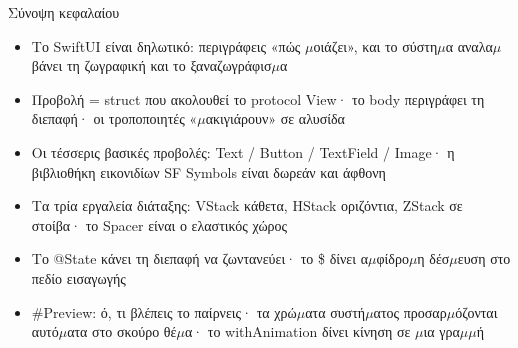 \begin{tcbsummary}{Σύνοψη κεφαλαίου}
\begin{itemize}
  \item Το SwiftUI είναι δηλωτικό: περιγράφεις «πώς $\mu$οιάζει», και το σύστη$\mu$α αναλα$\mu$βάνει τη ζωγραφική και το ξαναζωγράφισ$\mu$α
  \item Προβολή = struct που ακολουθεί το protocol View· το body περιγράφει τη διεπαφή· οι τροποποιητές «$\mu$ακιγιάρουν» σε αλυσίδα
  \item Οι τέσσερις βασικές προβολές: Text / Button / TextField / Image· η βιβλιοθήκη εικονιδίων SF Symbols είναι δωρεάν και άφθονη
  \item Τα τρία εργαλεία διάταξης: VStack κάθετα, HStack οριζόντια, ZStack σε στοίβα· το Spacer είναι ο ελαστικός χώρος
  \item Το @State κάνει τη διεπαφή να ζωντανεύει· το \$ δίνει α$\mu$φίδρο$\mu$η δέσ$\mu$ευση στο πεδίο εισαγωγής
  \item \#Preview: ό, τι βλέπεις το παίρνεις· τα χρώ$\mu$ατα συστή$\mu$ατος προσαρ$\mu$όζονται αυτό$\mu$ατα στο σκούρο θέ$\mu$α· το withAnimation δίνει κίνηση σε $\mu$ια γρα$\mu$$\mu$ή
\end{itemize}

\end{tcbsummary}
